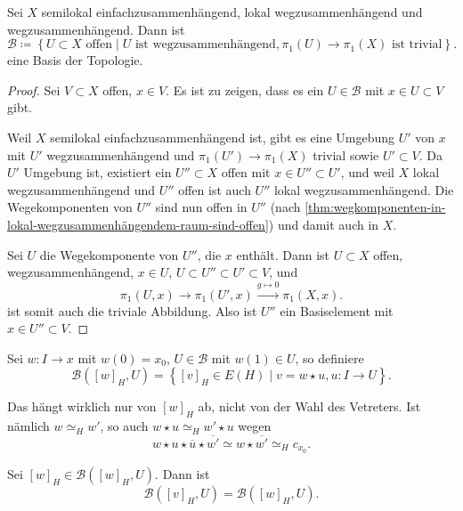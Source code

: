 \begin{lemma}\label{lm:basis-vonsemilokal-einfachzusammenhängendem-zusammenhängendem-raum}
    Sei $X$ semilokal einfachzusammenhängend, lokal wegzusammenhängend und wegzusammenhängend. Dann ist
     \[
         \mathcal{B} \coloneqq  \left \{U\subset X \text{ offen}\mid  U \text{ ist wegzusammenhängend}, \pi_1(U) \to  \pi_1(X) \text{ ist trivial}\right\} 
    .\] 
    eine Basis der Topologie.
\end{lemma}


\begin{proof}
    Sei $V\subset X$ offen, $x\in V$. Es ist zu zeigen, dass es ein $U\in \mathcal{B}$ mit $x\in U\subset V$ gibt. 

    Weil $X$ semilokal einfachzusammenhängend ist, gibt es eine Umgebung  $U'$ von  $x$ mit  $U'$ wegzusammenhängend und $\pi_1(U') \to  \pi_1(X)$ trivial sowie $U'\subset V$. Da $U'$ Umgebung ist, existiert ein  $U''\subset X$ offen mit $x\in U'' \subset U'$, und weil $X$ lokal wegzusammenhängend und  $U''$ offen ist auch  $U''$ lokal wegzusammenhängend. Die Wegekomponenten von  $U''$ sind nun offen in  $U''$ (nach  \autoref{thm:wegkomponenten-in-lokal-wegzusammenhängendem-raum-sind-offen}) und damit auch in $X$. 

    Sei $U$ die Wegekomponente von  $U''$, die  $x$ enthält. Dann ist  $U\subset X$ offen, wegzusammenhängend, $x\in U$, $U\subset U''\subset U'\subset V$, und
    \[
        \pi_1(U,x) \to  \pi_1(U',x) \stackrel{g \mapsto 0}{\longrightarrow}   \pi_1(X,x)
    .\] 
    ist somit auch die triviale Abbildung. Also ist $U''$ ein Basiselement mit $x\in U''\subset V$.
\end{proof}

Sei $w\colon I\to x$         mit $w(0) = x_0$, $U\in \mathcal{B}$ mit $w(1) \in U$, so definiere
\[
    \mathcal{B}([w]_H,U) = \left \{[v]_H \in E(H) \mid v = w \star u, u\colon I\to U\right\}  
.\]

\begin{recap}
    Das hängt wirklich nur von $[w]_H$ ab, nicht von der Wahl des Vetreters. Ist nämlich  $w \simeq_H w'$, so auch  $w \star u \simeq_H w' \star u$ wegen
     \[
    w \star u \star \overline{u} \star \overline{w'} \simeq w \star \overline{w'} \simeq_H c_{x_0}
    .\] 
\end{recap}

\begin{lemma}
    Sei $[w]_H\in \mathcal{B}([w]_H,U)$. Dann ist
    \[
        \mathcal{B}([v]_H,U) = \mathcal{B}([w]_H,U)
    .\] 
\end{lemma}

